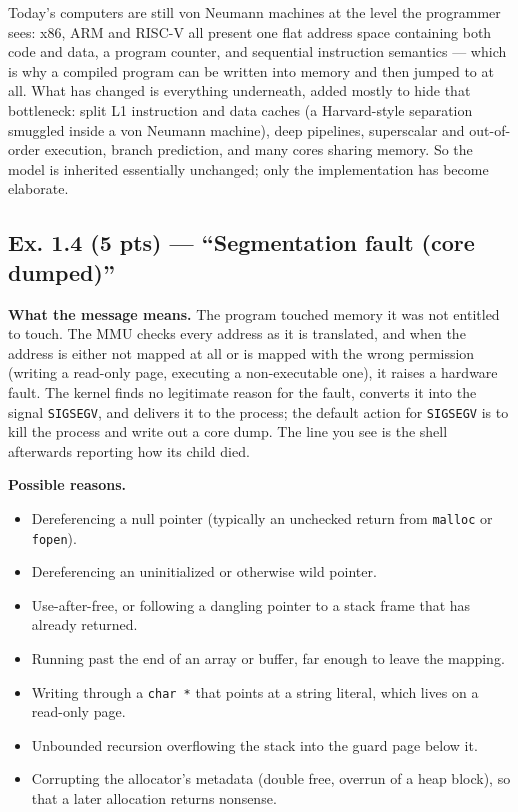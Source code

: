 Today's computers are still von Neumann machines at the level the programmer sees:
x86, ARM and RISC-V all present one flat address space containing both code and data, a
program counter, and sequential instruction semantics --- which is why a compiled program
can be written into memory and then jumped to at all. What has changed is everything
underneath, added mostly to hide that bottleneck: split L1 instruction and data caches (a
Harvard-style separation smuggled inside a von Neumann machine), deep pipelines,
superscalar and out-of-order execution, branch prediction, and many cores sharing memory.
So the model is inherited essentially unchanged; only the implementation has become
elaborate.

\subsection*{Ex. 1.4 (5 pts) --- ``Segmentation fault (core dumped)''}
\label{p1:sec:segfault}

\textbf{What the message means.} The program touched memory it was not entitled to touch.
The MMU checks every address as it is translated, and when the address is either not
mapped at all or is mapped with the wrong permission (writing a read-only page, executing
a non-executable one), it raises a hardware fault. The kernel finds no legitimate reason
for the fault, converts it into the signal \texttt{SIGSEGV}, and delivers it to the
process; the default action for \texttt{SIGSEGV} is to kill the process and write out a
core dump. The line you see is the shell afterwards reporting how its child died.

\textbf{Possible reasons.}
\begin{itemize}[nosep,leftmargin=1.4em,label=$\bullet$]
  \item Dereferencing a null pointer (typically an unchecked return from
        \texttt{malloc} or \texttt{fopen}).
  \item Dereferencing an uninitialized or otherwise wild pointer.
  \item Use-after-free, or following a dangling pointer to a stack frame that has
        already returned.
  \item Running past the end of an array or buffer, far enough to leave the mapping.
  \item Writing through a \texttt{char *} that points at a string literal, which lives on
        a read-only page.
  \item Unbounded recursion overflowing the stack into the guard page below it.
  \item Corrupting the allocator's metadata (double free, overrun of a heap block), so
        that a later allocation returns nonsense.
\end{itemize}

